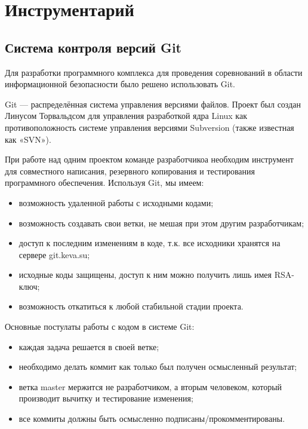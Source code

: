 \section{Инструментарий}

\subsection{Система контроля версий Git}

Для разработки программного комплекса для проведения соревнований в области информационной безопасности было решено использовать Git.\par

Git --- распределённая система управления версиями файлов. Проект был создан Линусом Торвальдсом для управления разработкой ядра Linux  как противоположность  системе управления версиями Subversion (также известная как «SVN»).\par

При работе над одним проектом команде разработчикоа необходим инструмент для совместного написания, резервного копирования и тестирования программного обеспечения. Используя Git, мы имеем:
\begin{itemize}
\item возможность удаленной работы с исходными кодами;
\item возможность создавать свои ветки, не мешая при этом другим разработчикам;
\item доступ к последним изменениям в коде, т.к. все исходники хранятся на сервере git.keva.su;
\item исходные коды защищены, доступ к ним можно получить лишь имея RSA-ключ;
\item возможность откатиться к любой стабильной стадии проекта.
\end{itemize}

Основные постулаты работы с кодом в системе Git:

\begin{itemize}
\item каждая задача решается в своей ветке;
\item необходимо делать коммит как только был получен осмысленный результат;
\item ветка master мержится не разработчиком, а вторым человеком, который производит вычитку и тестирование изменения;
\item все коммиты должны быть осмысленно подписаны/прокомментированы.
\end{itemize}

